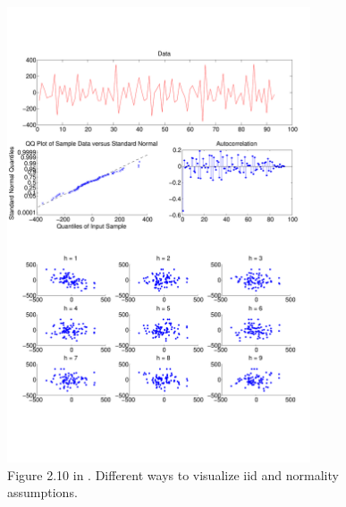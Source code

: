 \documentclass[10pt]{article}
\begin{document}
\begin{figure}[H]
  \centering
  \includegraphics[width=0.8\textwidth, trim=0 80 0 100]{images/hw1_1_210}
  \caption{Figure 2.10 in \cite{leb}. Different ways to visualize iid and normality assumptions.}
  \label{fig:210}
\end{figure}


\FloatBarrier
\end{document}
